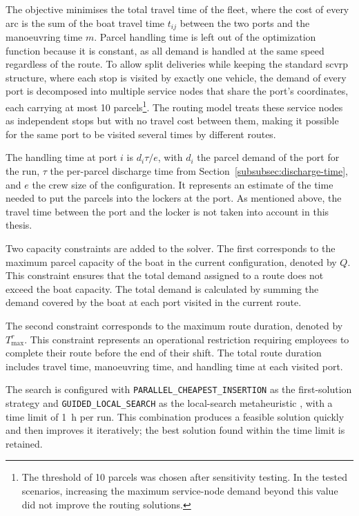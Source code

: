 \documentclass[12pt]{article}
\begin{document}
The objective minimises the total travel time of the fleet, where the cost of every arc is the sum of the boat travel time \(t_{ij}\) between the two ports and the manoeuvring time \(m\). Parcel handling time is left out of the optimization function because it is constant, as all demand is handled at the same speed regardless of the route. To allow split deliveries while keeping the standard \ac{scvrp} structure, where each stop is visited by exactly one vehicle, the demand of every port is decomposed into multiple service nodes that share the port's coordinates, each carrying at most \num{10} parcels\footnote{The threshold of \num{10} parcels was chosen after sensitivity testing. In the tested scenarios, increasing the maximum service-node demand beyond this value did not improve the routing solutions.}. The routing model treats these service nodes as independent stops but with no travel cost between them, making it possible for the same port to be visited several times by different routes.

The handling time at port \(i\) is \(d_i \tau / e\), with \(d_i\) the parcel demand of the port for the run, \(\tau\) the per-parcel discharge time from Section~\ref{subsubsec:discharge-time}, and \(e\) the crew size of the configuration. It represents an estimate of the time needed to put the parcels into the lockers at the port. As mentioned above, the travel time between the port and the locker is not taken into account in this thesis.

Two capacity constraints are added to the solver. The first corresponds to the maximum parcel capacity of the boat in the current configuration, denoted by \(Q\). This constraint ensures that the total demand assigned to a route does not exceed the boat capacity. The total demand is calculated by summing the demand covered by the boat at each port visited in the current route.

The second constraint corresponds to the maximum route duration, denoted by \(T^{r}_{\max}\). This constraint represents an operational restriction requiring employees to complete their route before the end of their shift. The total route duration includes travel time, manoeuvring time, and handling time at each visited port.

The search is configured with \texttt{PARALLEL\_CHEAPEST\_INSERTION} as the first-solution strategy and \texttt{GUIDED\_LOCAL\_SEARCH} as the local-search metaheuristic \parencite{ortools_routing}, with a time limit of \qty{1}{\hour} per run. This combination produces a feasible solution quickly and then improves it iteratively; the best solution found within the time limit is retained.
\end{document}
